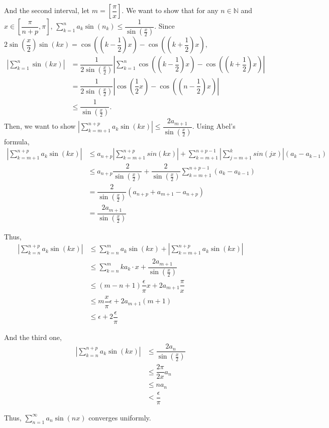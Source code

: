 \documentclass[12pt]{article}
\begin{document}
\begin{enumerate}
\begin{enumerate}
        \newpage
        And the second interval, let $m = [\dfrac{\pi}{x}]$.
        We want to show that for any $n\in\mathbb{N}$ and $x\in [\dfrac{\pi}{n+p}, \pi]$, $\displaystyle\sum_{k=1}^{n} a_k \sin(n_k) \leq \dfrac{1}{\sin(\frac{x}{2})}$.
        Since $2\sin(\dfrac{x}{2})\sin(kx) = \cos((k-\dfrac{1}{2})x) - \cos((k+\dfrac{1}{2})x)$,
        \begin{align*}
            |\sum_{k=1}^{n} \sin(kx)| &= \dfrac{1}{2\sin(\frac{x}{2})}|\sum_{k=1}^{n} \cos((k-\dfrac{1}{2})x) - \cos((k+\dfrac{1}{2})x)|\\
            &= \dfrac{1}{2\sin(\frac{x}{2})} |\cos(\dfrac{1}{2}x) - \cos((n-\dfrac{1}{2})x)|\\
            &\leq \dfrac{1}{\sin(\frac{x}{2})}.
        \end{align*}
        Then, we want to show $|\displaystyle\sum_{k=m+1}^{n+p} a_k \sin(kx)|\leq \dfrac{2a_{m+1}}{\sin(\frac{x}{2})}$.
        Using Abel's formula, \begin{align*}
            |\sum_{k=m+1}^{n+p} a_k\sin(kx)| &\leq a_{n+p} |\sum_{k=m+1}^{n+p} sin(kx)| + \sum_{k=m+1}^{n+p-1} |\sum_{j=m+1}^{k} sin(jx)|(a_k - a_{k-1})\\
            &\leq a_{n+p}\dfrac{2}{\sin(\frac{x}{2})} + \dfrac{2}{\sin(\frac{x}{2})} \sum_{k=m+1}^{n+p-1}(a_k - a_{k-1})\\
            &= \dfrac{2}{\sin(\frac{x}{2})} (a_{n+p} + a_{m+1} - a_{n+p})\\
            &= \dfrac{2a_{m+1}}{\sin(\frac{x}{2})}
        \end{align*}

        Thus, \begin{align*}
            |\sum_{k=n}^{n+p} a_k \sin(kx)| &\leq \sum_{k=n}^{m} a_k \sin(kx) + |\sum_{k=m+1}^{n+p} a_k\sin(kx)|\\
            &\leq  \sum_{k=n}^{m} ka_k\cdot x + \dfrac{2a_{m+1}}{\sin(\frac{x}{2})}\\
            &\leq (m-n+1) \dfrac{\epsilon}{\pi}x + 2a_{m+1} \dfrac{\pi}{x}\\
            &\leq m \dfrac{x}{\pi} \epsilon + 2 a_{m+1} (m+1)\\
            &\leq \epsilon + 2\dfrac{\epsilon}{\pi}
        \end{align*}

        And the third one, \begin{align*}
            |\sum_{k=n}^{n+p} a_k \sin(kx)| &\leq \dfrac{2a_n}{\sin(\frac{x}{2})} \\
            &\leq \dfrac{2\pi}{2x} a_n\\
            &\leq n a_n\\
            &< \dfrac{\epsilon}{\pi}
        \end{align*}

        Thus, $\displaystyle\sum_{n=1}^{\infty} a_n \sin(nx)$ converges uniformly.
        
    \end{enumerate}
\end{enumerate}
\end{document}
